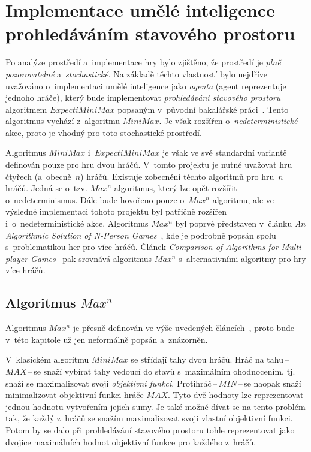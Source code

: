 \documentclass[11pt, a4paper]{article}
\theoremstyle{definition}
\begin{document}
\section{Implementace umělé inteligence prohledáváním stavového prostoru}
\label{sec:ai}

Po analýze prostředí a~implementace hry bylo zjištěno, že prostředí je
\emph{plně pozorovatelné} a~\emph{stochastické}. Na základě těchto
vlastností bylo nejdříve uvažováno o~implementaci umělé inteligence
jako \emph{agenta} (agent reprezentuje jednoho hráče), který bude
implementovat \emph{prohledávání stavového prostoru} algoritmem
$ ExpectiMiniMax $ popsaným v~původní bakalářské práci~\cite{turecekBP}.
Tento algoritmus vychází z~algoritmu $ MiniMax $. Je však rozšířen
o~\emph{nedeterministické} akce, proto je vhodný pro toto stochastické
prostředí.

Algoritmus $ MiniMax $ i~$ ExpectiMiniMax $ je však ve své standardní
variantě definován pouze pro hru dvou hráčů. V~tomto projektu je
nutné uvažovat hru čtyřech (a~obecně~$ n $) hráčů. Existuje zobecnění
těchto algoritmů pro hru~$ n $ hráčů. Jedná se o~tzv. $ Max^n $ algoritmus,
který lze opět rozšířit o~nedeterminismus. Dále bude hovořeno pouze
o~$ Max^n $ algoritmu, ale ve výsledné implementaci tohoto projektu byl
patřičně rozšířen i~o~nedeterministické akce. Algoritmus $ Max^n $ byl
poprvé představen v~článku \emph{An Algorithmic Solution of N-Person
Games}~\cite{nPersonGames}, kde je podrobně popsán spolu s~problematikou her
pro více hráčů. Článek \emph{Comparison of Algorithms for Multi-player
Games}~\cite{compMultiPlGames} pak srovnává algoritmus $ Max^n $
s~alternativními algoritmy pro hry více hráčů.

\subsection{\texorpdfstring{Algoritmus $ Max^n $}{Algoritmus MaxN}}

Algoritmus $ Max^n $ je přesně definován ve výše uvedených
článcích~\cite{nPersonGames, compMultiPlGames}, proto bude v~této kapitole už
jen neformálně popsán a~znázorněn.

V~klasickém algoritmu $ MiniMax $ se střídají tahy dvou hráčů. Hráč na
tahu\,--\,$ MAX $\,--\,se snaží vybírat tahy vedoucí do stavů s~maximálním
ohodnocením, tj. snaží se maximalizovat svoji \emph{objektivní funkci}.
Protihráč\,--\,$ MIN $\,--\,se naopak snaží minimalizovat objektivní funkci
hráče $ MAX $. Tyto dvě hodnoty lze reprezentovat jednou hodnotu
vytvořením jejich sumy. Je také možné dívat se na tento problém tak, že
každý z~hráčů se snažím maximalizovat svoji vlastní objektivní
funkci. Potom by se dalo při prohledávání stavového prostoru tohle
reprezentovat jako dvojice maximálních hodnot objektivní funkce pro
každého z~hráčů.
\end{document}
